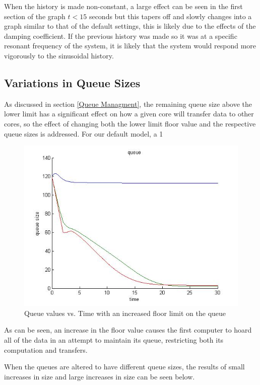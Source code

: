 \documentclass{article}
\begin{document}
When the history is made non-constant, a large effect can be seen in the first section of the graph $t<15$ seconds but this tapers off and slowly changes into a graph similar to that of the default settings, this is likely due to the effects of the damping coefficient. If the previous history was made so it was at a specific resonant frequency of the system, it is likely that the system would respond more vigorously to the sinusoidal history.

\subsection{Variations in Queue Sizes}
As discussed in section \ref{Queue Managment}, the remaining queue size above the lower limit has a significant effect on how a given core will transfer data to other cores, so the effect of changing both the lower limit floor value and the respective queue sizes is addressed. For our default model, a 1%

\begin{figure}[H]
\label{Floor increased}
\centering
\includegraphics[width=.4\linewidth] {floor_increased}
\caption{Queue values vs. Time with an increased floor limit on the queue}
\end{figure}

As can be seen, an increase in the floor value causes the first computer to hoard all of the data in an attempt to maintain its queue, restricting both its computation and transfers.

When the queues are altered to have different queue sizes, the results of small increases in size and large increases in size can be seen below.
\end{document}
